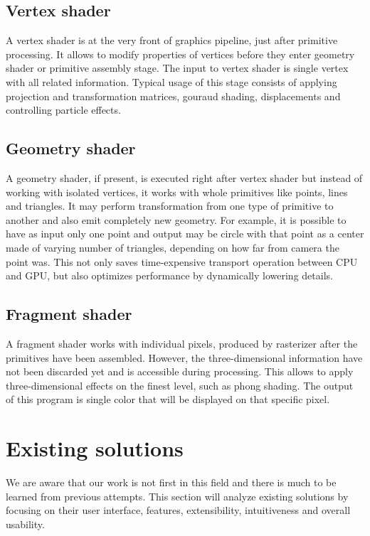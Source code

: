 \subsection{Vertex shader}
A vertex shader is at the very front of graphics pipeline, just after primitive
processing. It allows to modify properties of vertices before they enter
geometry shader or primitive assembly stage. The input to vertex shader is
single vertex with all related information. Typical usage of this stage consists
of applying projection and transformation matrices, gouraud shading,
displacements and controlling particle effects.

\subsection{Geometry shader}
A geometry shader, if present, is executed right after vertex shader but instead
of working with isolated vertices, it works with whole primitives like points,
lines and triangles. It may perform transformation from one type of primitive to
another and also emit completely new geometry. For example, it is possible to
have as input only one point and output may be circle with that point as a
center made of varying number of triangles, depending on how far from camera
the point was. This not only saves time-expensive transport operation between
CPU and GPU, but also optimizes performance by dynamically lowering details.

\subsection{Fragment shader}
A fragment shader works with individual pixels, produced by rasterizer after the
primitives have been assembled. However, the three-dimensional information have
not been discarded yet and is accessible during processing. This allows to apply
three-dimensional effects on the finest level, such as phong shading. The output
of this program is single color that will be displayed on that specific pixel.

\section{Existing solutions}
We are aware that our work is not first in this field and there is much to be
learned from previous attempts. This section will analyze existing solutions
by focusing on their user interface, features, extensibility, intuitiveness 
and overall usability.


